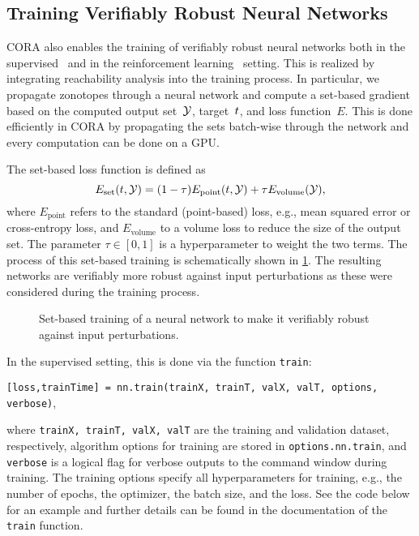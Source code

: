 \subsection{Training Verifiably Robust Neural Networks}
\label{sec:neuralNetworkTraining}

CORA also enables the training of verifiably robust neural networks both in the supervised~\cite{koller2024a}
and in the reinforcement learning~\cite{Wendl2024a} setting.
This is realized by integrating reachability analysis into the training process.
In particular, we propagate zonotopes through a neural network and compute a set-based gradient based on the computed output set~$\mathcal{Y}$, target~$t$, and loss function~$E$.
This is done efficiently in CORA by propagating the sets batch-wise through the network and every computation can be done on a GPU.

The set-based loss function is defined as
\begin{equation}
    E_\text{set}(t,\mathcal{Y}) = (1-\tau) E_\text{point}(t,\mathcal{Y}) + \tau E_\text{volume}(\mathcal{Y}),
\end{equation}
where $E_\text{point}$ refers to the standard (point-based) loss, e.g., mean squared error or cross-entropy loss,
and $E_\text{volume}$ to a volume loss to reduce the size of the output set.
The parameter $\tau\in[0,1]$ is a hyperparameter to weight the two terms.
The process of this set-based training is schematically shown in \cref{fig:set-training}.
The resulting networks are verifiably more robust against input perturbations as these were considered during the training process.

\begin{figure}[htb]
    \centering
    \footnotesize
    \caption{Set-based training of a neural network to make it verifiably robust against input perturbations.}
    \label{fig:set-training}
\end{figure}

In the supervised setting, this is done via the function \texttt{train}:
\begin{center}
    \texttt{[loss,trainTime] = nn.train(trainX, trainT, valX, valT, options, verbose)},
\end{center}
where \texttt{trainX, trainT, valX, valT} are the training and validation dataset, respectively,
algorithm options for training are stored in \texttt{options.nn.train},
and \texttt{verbose} is a logical flag for verbose outputs to the command window during training.
The training options specify all hyperparameters for training,
e.g., the number of epochs, the optimizer, the batch size, and the loss.
See the code below for an example and further details can be found in the documentation of the \texttt{train} function.

